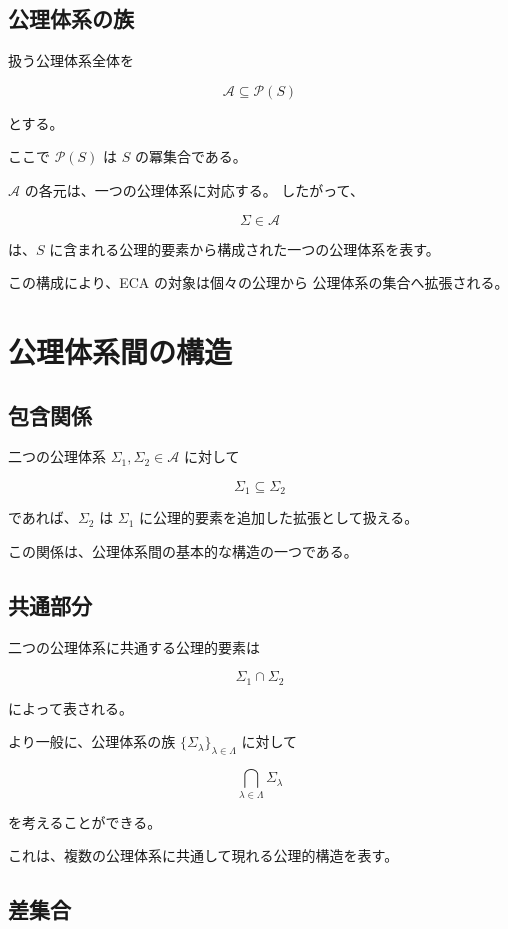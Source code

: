 \documentclass[12pt,a4paper]{article}
\begin{document}
\subsection{公理体系の族}

扱う公理体系全体を

\[
\mathscr{A}\subseteq\mathcal{P}(S)
\]

とする。

ここで $\mathcal{P}(S)$ は $S$ の冪集合である。

$\mathscr{A}$ の各元は、一つの公理体系に対応する。
したがって、

\[
\Sigma\in\mathscr{A}
\]

は、$S$ に含まれる公理的要素から構成された一つの公理体系を表す。

この構成により、ECA の対象は個々の公理から
公理体系の集合へ拡張される。

\section{公理体系間の構造}

\subsection{包含関係}

二つの公理体系 $\Sigma_1,\Sigma_2\in\mathscr{A}$ に対して

\[
\Sigma_1\subseteq\Sigma_2
\]

であれば、$\Sigma_2$ は $\Sigma_1$ に公理的要素を追加した拡張として扱える。

この関係は、公理体系間の基本的な構造の一つである。

\subsection{共通部分}

二つの公理体系に共通する公理的要素は

\[
\Sigma_1\cap\Sigma_2
\]

によって表される。

より一般に、公理体系の族
$\{\Sigma_\lambda\}_{\lambda\in\Lambda}$ に対して

\[
\bigcap_{\lambda\in\Lambda}\Sigma_\lambda
\]

を考えることができる。

これは、複数の公理体系に共通して現れる公理的構造を表す。

\subsection{差集合}
\end{document}
